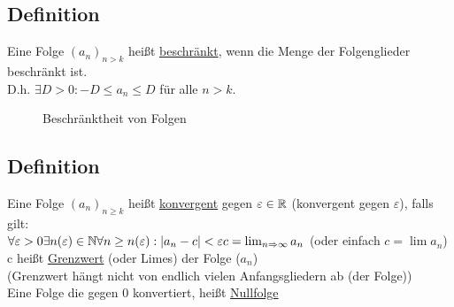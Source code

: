 \subsection{Definition}
Eine Folge $(a_n)_{n>k}$ hei\ss t \underline{beschr\"ankt}, wenn die Menge der Folgenglieder beschr\"ankt ist. \\
D.h. $\exists D > 0 : - D \leq a_n \leq D$ f\"ur alle $n > k$.\\

\begin{figure}[h!]
\centering \caption{Beschränktheit von Folgen}
\end{figure}
\subsection{Definition}
Eine Folge $(a_n)_{n \geq k}$ hei\ss t \uline{konvergent} gegen $\varepsilon \in \mathbb{R}$ (konvergent gegen $\varepsilon$), falls gilt:\\
$\forall \varepsilon > 0 \exists n(\varepsilon) \in \mathbb{N} \forall n \geq n(\varepsilon) : \lvert a_n -c \rvert < \varepsilon\\
c = \lim_{n \Rightarrow \infty} a_n $ (oder einfach $c = \lim a_n$)\\
c hei\ss t \uline{Grenzwert} (oder Limes) der Folge ($a_n$)\\
(Grenzwert h\"angt nicht von endlich vielen Anfangsgliedern ab (der Folge))\\
Eine Folge die gegen 0 konvertiert, hei\ss t \uline{Nullfolge}\\
